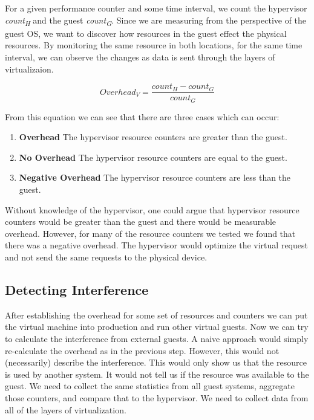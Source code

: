 \indent For a given performance counter and some time interval, we count the hypervisor \emph{count\textsubscript{H}} and the guest \emph{count\textsubscript{G}}. Since we are measuring from the perspective of the guest OS, we want to discover how resources in the guest effect the physical resources.  By monitoring the same resource in both locations, for the same time interval, we can observe the changes as data is sent through the layers of virtualizaion. 

\begin{equation}
  Overhead_V = \frac{count_H - count_G}{count_G} 
\end{equation}

From this equation we can see that there are three cases which can occur:
\begin{enumerate}
	\item \textbf{Overhead} The hypervisor resource counters are greater than the guest. 
	\item \textbf{No Overhead} The hypervisor resource counters are equal to the guest.
	\item \textbf{Negative Overhead} The hypervisor resource counters are less than the guest.
\end{enumerate}
Without knowledge of the hypervisor, one could argue that hypervisor resource counters would be greater than the guest and there would be measurable overhead.  
However, for many of the resource counters we tested we found that there was a negative overhead.  
The hypervisor would optimize the virtual request and not send the same requests to the physical device.

\subsection{Detecting Interference}
After establishing the overhead for some set of resources and counters we can put the virtual machine into production and run other virtual guests. Now we can try to calculate the interference from external guests.  A naive approach would  simply re-calculate the overhead as in the previous step.  However, this would not (necessarily) describe the interference.  This would only show us that the resource is used by another system.  
It would not tell us if the resource was available to the guest.
We need to collect the same statistics from all guest systems, aggregate those counters, and compare that to the hypervisor.  We need to collect data from all of the layers of virtualization.

